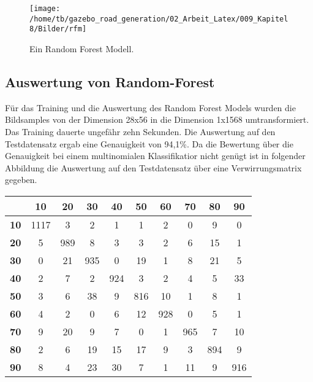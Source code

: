 {{{{{{{{{\begin{figure}[H]
\begin{center}
  \texttt{[image: /home/tb/gazebo\_road\_generation/02\_Arbeit\_Latex/009\_Kapitel8/Bilder/rfm]}%
  \caption[Ein Random Forest Modell]%
           {\label{fig:Ein Random Forest Modell}%
           Ein Random Forest Modell.
           }
\end{center}
\end{figure}

\subsection{Auswertung von Random-Forest}
\label{subsec:Auswertung von Random-Forest}


F\"ur das Training und die Auswertung des Random Forest Models wurden die Bildsamples von der Dimension 28x56 in die Dimension 1x1568 umtransformiert.
Das Training dauerte ungef{\"a}hr zehn Sekunden.
Die Auswertung auf den Testdatensatz ergab eine Genauigkeit von 94,1\%.
Da die Bewertung über die Genauigkeit bei einem multinomialen Klassifikatior nicht genügt ist in folgender Abbildung die Auswertung auf den Testdatensatz über eine Verwirrungsmatrix gegeben.

\begin{center}


\begin{tabular}{|c|c|c|c|c|c|c|c|c|c|}
\hline
    & \textbf{10} & \textbf{20} & \textbf{30} & \textbf{40} & \textbf{50} & \textbf{60} & \textbf{70} & \textbf{80} & \textbf{90} \\
\hline
\textbf{10} & 1117 &  3 &  2 &  1 &  1 &  2 &  0 &  9 &  0 \\
\hline
\textbf{20} &  5  & 989 &   8 &   3 &   3 &   2 &   6 &  15 &   1 \\
\hline
\textbf{30} & 0  & 21 & 935  &  0 &  19 &   1 &   8 &  21 &   5 \\
\hline 
\textbf{40} &  2 &   7 &   2 & 924  &  3  &  2 &   4  &  5 &  33 \\
\hline 
\textbf{50} &  3 &   6 &  38 &   9 & 816 &  10 &   1 &   8 &   1 \\
\hline 
\textbf{60} &  4  &  2 &   0 &   6 &  12 & 928 &   0  &  5 &   1 \\
\hline 
\textbf{70} &  9  & 20 &   9 &   7 &   0  &  1 & 965  &  7 &  10 \\
\hline 
\textbf{80} &  2  &  6 &  19 &  15 &  17 &   9  &  3 & 894  &  9 \\
\hline
\textbf{90} &  8  &  4 &  23 &  30 &   7 &   1 &  11 &   9 & 916 \\
\hline
\end{tabular}


\end{center}}}}}}}}}}
